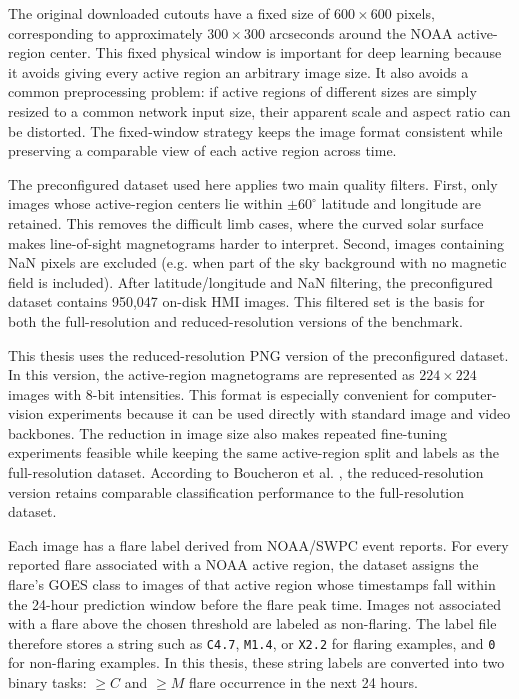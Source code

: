 The original downloaded cutouts have a fixed size of $600 \times 600$ pixels, corresponding to approximately $300 \times 300$ arcseconds around the NOAA active-region center. This fixed physical window is important for deep learning because it avoids giving every active region an arbitrary image size. It also avoids a common preprocessing problem: if active regions of different sizes are simply resized to a common network input size, their apparent scale and aspect ratio can be distorted. The fixed-window strategy keeps the image format consistent while preserving a comparable view of each active region across time.

The preconfigured dataset used here applies two main quality filters. First, only images whose active-region centers lie within $\pm 60^\circ$ latitude and longitude are retained. This removes the difficult limb cases, where the curved solar surface makes line-of-sight magnetograms harder to interpret. Second, images containing NaN pixels are excluded (e.g. when part of the sky background with no magnetic field is included). After latitude/longitude and NaN filtering, the preconfigured dataset contains 950,047 on-disk HMI images. This filtered set is the basis for both the full-resolution and reduced-resolution versions of the benchmark.

This thesis uses the reduced-resolution PNG version of the preconfigured dataset. In this version, the active-region magnetograms are represented as $224 \times 224$ images with 8-bit intensities. This format is especially convenient for computer-vision experiments because it can be used directly with standard image and video backbones. The reduction in image size also makes repeated fine-tuning experiments feasible while keeping the same active-region split and labels as the full-resolution dataset.  According to Boucheron et al. \cite{ref_boucheron}, the reduced-resolution version retains comparable classification performance to the full-resolution dataset.

Each image has a flare label derived from NOAA/SWPC event reports. For every reported flare associated with a NOAA active region, the dataset assigns the flare's GOES class to images of that active region whose timestamps fall within the 24-hour prediction window before the flare peak time. Images not associated with a flare above the chosen threshold are labeled as non-flaring. The label file therefore stores a string such as \texttt{C4.7}, \texttt{M1.4}, or \texttt{X2.2} for flaring examples, and \texttt{0} for non-flaring examples. In this thesis, these string labels are converted into two binary tasks: $\geq C$ and $\geq M$ flare occurrence in the next 24 hours.

